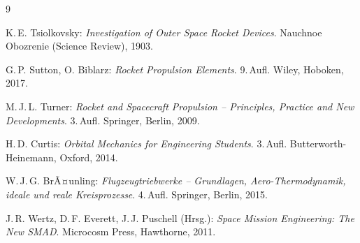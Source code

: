﻿\documentclass[12pt,a4paper]{article}
\begin{document}
\begin{thebibliography}{9}

K.\,E. Tsiolkovsky:
\textit{Investigation of Outer Space Rocket Devices}.
Nauchnoe Obozrenie (Science Review), 1903.

G.\,P. Sutton, O. Biblarz:
\textit{Rocket Propulsion Elements}.
9.\,Aufl. Wiley, Hoboken, 2017.

M.\,J.\,L. Turner:
\textit{Rocket and Spacecraft Propulsion -- Principles, Practice and New Developments}.
3.\,Aufl. Springer, Berlin, 2009.

H.\,D. Curtis:
\textit{Orbital Mechanics for Engineering Students}.
3.\,Aufl. Butterworth-Heinemann, Oxford, 2014.

W.\,J.\,G. BrÃ¤unling:
\textit{Flugzeugtriebwerke -- Grundlagen, Aero-Thermodynamik, ideale und reale Kreisprozesse}.
4.\,Aufl. Springer, Berlin, 2015.

J.\,R. Wertz, D.\,F. Everett, J.\,J. Puschell (Hrsg.):
\textit{Space Mission Engineering: The New SMAD}.
Microcosm Press, Hawthorne, 2011.

\end{thebibliography}
\end{document}
